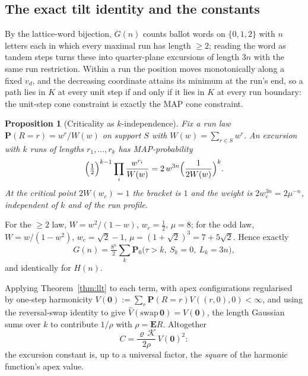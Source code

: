 \documentclass[11pt]{article}
\newtheorem{proposition}[theorem]{Proposition}
\theoremstyle{definition}
\newcommand{\E}{\mathbf{E}}
\renewcommand{\Pr}{\mathbf{P}}
\begin{document}
\subsection{The exact tilt identity and the constants}

By the lattice-word bijection, $G(n)$ counts ballot words on $\{0,1,2\}$ with
$n$ letters each in which every maximal run has length $\ge2$; reading the word
as tandem steps turns these into quarter-plane excursions of length $3n$ with
the same run restriction. Within a run the position moves monotonically along a
fixed $v_d$, and the decreasing coordinate attains its minimum at the run's
end, so a path lies in $K$ at every unit step if and only if it lies in $K$ at
every run boundary: the unit-step cone constraint is exactly the MAP cone
constraint.

\begin{proposition}[Criticality as $k$-independence]
Fix a run law $\Pr(R=r)=w^{r}/W(w)$ on support $S$ with $W(w)=\sum_{r\in S}w^{r}$.
An excursion with $k$ runs of lengths $r_1,\dots,r_k$ has MAP-probability
\[
  \Bigl(\tfrac12\Bigr)^{k-1}\prod_i\frac{w^{r_i}}{W(w)}
  =2\,w^{3n}\Bigl(\frac{1}{2W(w)}\Bigr)^{k}.
\]
At the critical point $2W(w_c)=1$ the bracket is $1$ and the weight is
$2w_c^{3n}=2\mu^{-n}$, independent of $k$ and of the run profile.
\end{proposition}

For the $\ge2$ law, $W=w^{2}/(1-w)$, $w_c=\tfrac12$, $\mu=8$; for the odd law,
$W=w/(1-w^{2})$, $w_c=\sqrt2-1$, $\mu=(1+\sqrt2)^{3}=7+5\sqrt2$. Hence exactly
\[
  G(n)=\tfrac{8^{n}}{2}\sum_k\Pr_0\bigl(\tau>k,\ S_k=0,\ L_k=3n\bigr),
\]
and identically for $H(n)$.

Applying Theorem~\ref{thm:llt} to each term, with apex configurations
regularised by one-step harmonicity
$V(\mathbf0):=\sum_r\Pr(R=r)V((r,0),0)<\infty$, and using the reversal-swap
identity to give $\widehat V(\mathrm{swap}\,\mathbf0)=V(\mathbf0)$, the length
Gaussian sums over $k$ to contribute $1/\rho$ with $\rho=\E R$. Altogether
\begin{equation}\label{eq:Csquare}
  C=\frac{\varrho\,\mathcal K}{2\rho}\,V(\mathbf0)^{2}:
\end{equation}
the excursion constant is, up to a universal factor, the \emph{square} of the
harmonic function's apex value.
\end{document}
